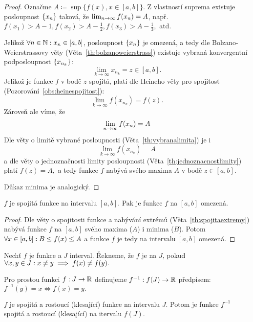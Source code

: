 \begin{proof}
    Označme $A \coloneqq \sup \{f(x), x \in [a,b]\}.$ Z vlastností suprema
    existuje posloupnost $\left\{x_n\right\}$ taková, že $\lim_{n\to\infty} f(x_n) = A$, 
    např. $f(x_1) > A -1, f(x_2) > A - \frac{1}{2}, f(x_3) > A - \frac{1}{3},$ atd.

    Jelikož $\forall n \in \mathbb{N}: x_n \in [a, b]$, posloupnost $\left\{x_n\right\}$ je omezená, 
    a tedy dle Bolzano-Weierstrassovy věty (Věta~\ref{th:bolzanoweierstrass})
    existuje vybraná konvergentní podposloupnost $\left\{x_{n_k}\right\}$:
    $$\lim_{k \to \infty} x_{n_k} = z \in [a,b].$$
    Jelikož je funkce $f$ v bodě $z$ spojitá, platí dle Heineho věty pro
    spojitost (Pozorování~\ref{obs:heinespojitost}):
    $$\lim_{k \to \infty} f(x_{n_k}) = f(z).$$
    Zároveň ale víme, že 
    $$\lim_{n\to\infty} f(x_n) = A$$
    Dle věty o limitě vybrané posloupnosti (Věta~\ref{th:vybranalimita}) je i
    $$\lim_{k \to \infty} f(x_{n_k}) = A$$
    a dle věty o jednoznačnosti limity posloupnosti 
    (Věta~\ref{th:jednoznacnostlimity}) platí $f(z) = A,$ 
    a tedy funkce $f$ nabývá svého maxima $A$ v bodě $z \in [a,b].$

    Důkaz minima je analogický.
\end{proof}

\begin{theorem}
    \Necht $f$ je spojitá funkce na intervalu $[a,b].$ Pak je funkce $f$ na 
    $[a,b]$ omezená.
\end{theorem}

\begin{proof}
    Dle věty o spojitosti funkce a nabývání extrémů (Věta~\ref{th:spojitaextremy})
    nabývá funkce $f$ na $[a,b]$ svého maxima ($A$) i minima ($B$). 
    Potom $\forall x \in [a,b]: B \leq f(x) \leq A$ a funkce $f$ je tedy na intervalu
    $[a,b]$ omezená.
\end{proof}

\begin{definition}
    Nechť $f$ je funkce a $J$ interval. Řekneme, že $f$ je  na $J$,
    pokud $\forall x,y \in J: x \neq y \implies f(x) \neq f(y).$

    Pro prostou funkci $f: J \rightarrow \mathbb{R}$ definujeme 
    $f^{-1}: f(J) \rightarrow \mathbb{R}$ předpisem: $f^{-1}(y) = x \iff f(x) = y.$
\end{definition}

\begin{theorem}
    \label{th:inversnifce}
    \Necht $f$ je spojitá a rostoucí (klesající) funkce na intervalu $J$. Potom
    je funkce $f^{-1}$ spojitá a rostoucí (klesající) na itervalu $f(J).$
\end{theorem}

